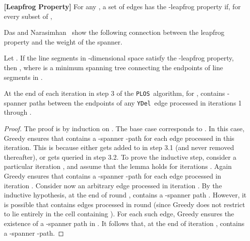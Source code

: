 \documentclass{llncs}
\newcommand{\ABox}{
\raisebox{3pt}{\framebox[6pt]{\rule{6pt}{0pt}}}
}
\newcommand{\palg}{{\tt PLOS}}
\newcommand{\ydel}{{\tt YDel}}
\begin{document}
\begin{definition}
{\bf [Leapfrog Property]}
For any , a set  of edges has the -leapfrog property if,
for every subset  of ,

\end{definition}
Das and Narasimhan~\cite{DasNarasimhan97} show the following
connection between the leapfrog property and the weight of the
spanner.
\begin{lemma}
\label{lem:DasNarasimhan}
Let . If the line segments  in -dimensional
space satisfy the -leapfrog property, then , where  is a minimum spanning tree connecting the
endpoints of line segments in .
\end{lemma}

\begin{lemma}
At the end of each iteration  in step 3 of the \palg\ algorithm,
for ,  contains -spanner paths between
the endpoints of any \ydel\ edge processed in iterations 1 through .
\label{lem:step3greedy}
\end{lemma}
\begin{proof}
The proof is by induction on . The base case corresponds to .
In this case, Greedy ensures that  contains a -spanner -path for
each edge  processed in this iteration. This is because 
either gets added to  in step 3.1 (and never removed thereafter),
or gets queried in step 3.2. To prove the inductive step, consider
a particular iteration , and assume that the lemma holds for iterations
.
Again Greedy ensures that  contains a -spanner -path for
each edge  processed in iteration . Consider now an arbitrary edge
 processed in iteration . By the inductive hypothesis, at
the end of round ,  contains a -spanner path .
However, it is possible that  contains edges processed in round
 (since Greedy does not restrict  to lie entirely in the
cell containing ). For each such edge, Greedy ensures the existence
of a -spanner path in . It follows that, at the end of iteration
,  contains a -spanner -path. \hfill\ABox
\end{proof}
\end{document}
